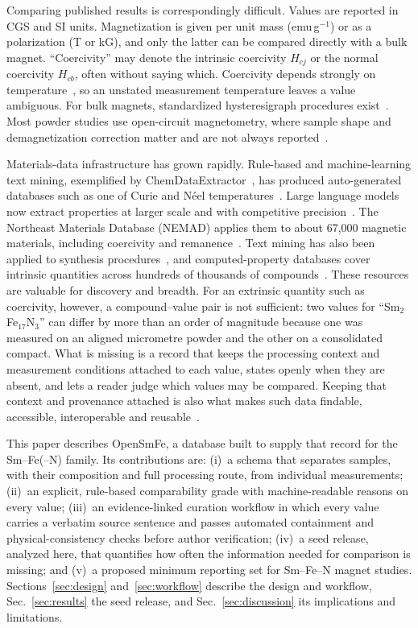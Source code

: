 \documentclass[10pt,twocolumn,letterpaper]{article}
\newcommand{\SmFeN}{Sm$_2$Fe$_{17}$N$_3$}
\begin{document}
Comparing published results is correspondingly difficult. Values are reported in CGS and SI units. Magnetization is given per unit mass (emu\,g$^{-1}$) or as a polarization (T or kG), and only the latter can be compared directly with a bulk magnet. ``Coercivity'' may denote the intrinsic coercivity $H_{cj}$ or the normal coercivity $H_{cb}$, often without saying which. Coercivity depends strongly on temperature~\cite{xu2024}, so an unstated measurement temperature leaves a value ambiguous. For bulk magnets, standardized hysteresigraph procedures exist~\cite{iec604045,astma977}. Most powder studies use open-circuit magnetometry, where sample shape and demagnetization correction matter and are not always reported~\cite{coey2010}.

Materials-data infrastructure has grown rapidly. Rule-based and machine-learning text mining, exemplified by ChemDataExtractor~\cite{swain2016,mavracic2021}, has produced auto-generated databases such as one of Curie and N\'eel temperatures~\cite{court2018}. Large language models now extract properties at larger scale and with competitive precision~\cite{polak2024}. The Northeast Materials Database (NEMAD) applies them to about 67,000 magnetic materials, including coercivity and remanence~\cite{itani2025}. Text mining has also been applied to synthesis procedures~\cite{kim2017}, and computed-property databases cover intrinsic quantities across hundreds of thousands of compounds~\cite{jain2013}. These resources are valuable for discovery and breadth. For an extrinsic quantity such as coercivity, however, a compound--value pair is not sufficient: two values for ``\SmFeN'' can differ by more than an order of magnitude because one was measured on an aligned micrometre powder and the other on a consolidated compact. What is missing is a record that keeps the processing context and measurement conditions attached to each value, states openly when they are absent, and lets a reader judge which values may be compared. Keeping that context and provenance attached is also what makes such data findable, accessible, interoperable and reusable~\cite{wilkinson2016}.

This paper describes OpenSmFe, a database built to supply that record for the Sm--Fe(--N) family. Its contributions are:
(i)~a schema that separates samples, with their composition and full processing route, from individual measurements;
(ii)~an explicit, rule-based comparability grade with machine-readable reasons on every value;
(iii)~an evidence-linked curation workflow in which every value carries a verbatim source sentence and passes automated containment and physical-consistency checks before author verification;
(iv)~a seed release, analyzed here, that quantifies how often the information needed for comparison is missing; and
(v)~a proposed minimum reporting set for Sm--Fe--N magnet studies.
Sections~\ref{sec:design} and~\ref{sec:workflow} describe the design and workflow, Sec.~\ref{sec:results} the seed release, and Sec.~\ref{sec:discussion} its implications and limitations.
\end{document}
